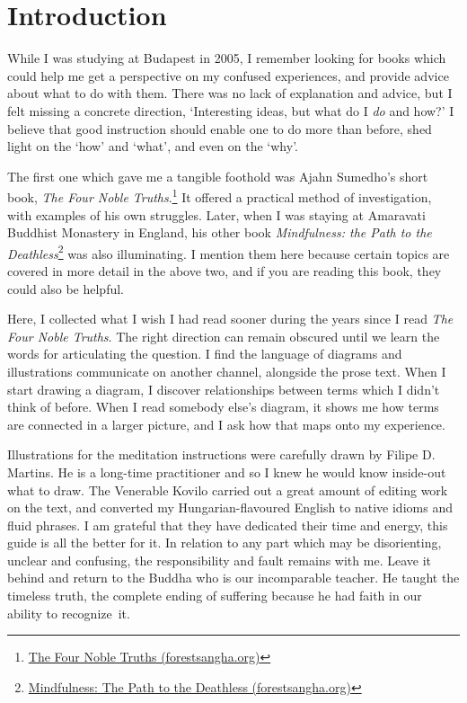\chapter{Introduction}

While I was studying at Budapest in 2005, I remember looking for books
which could help me get a perspective on my confused experiences, and
provide advice about what to do with them. There was no lack of
explanation and advice, but I felt missing a concrete direction,
`Interesting ideas, but what do I \emph{do} and how?' I believe that
good instruction should enable one to do more than before, shed light on
the `how' and `what', and even on the `why'.

The first one which gave me a tangible foothold was Ajahn Sumedho's
short book, \emph{The Four Noble Truths}.\footnote{\href{https://forestsangha.org/teachings/books/the-four-noble-truths?language=English}{The
  Four Noble Truths (forestsangha.org)}} It offered a practical method
of investigation, with examples of his own struggles. Later, when I was
staying at Amaravati Buddhist Monastery in England, his other book
\emph{Mindfulness: the Path to the Deathless}\footnote{\href{https://forestsangha.org/teachings/books/mindfulness-the-path-to-the-deathless?language=English}{Mindfulness:
  The Path to the Deathless (forestsangha.org)}} was also illuminating.
I mention them here because certain topics are covered in more detail in
the above two, and if you are reading this book, they could also be
helpful.

Here, I collected what I wish I had read sooner during the years since I
read \emph{The Four Noble Truths}. The right direction can remain
obscured until we learn the words for articulating the question. I find
the language of diagrams and illustrations communicate on another
channel, alongside the prose text. When I start drawing a diagram, I
discover relationships between terms which I didn't think of before.
When I read somebody else's diagram, it shows me how terms are connected
in a larger picture, and I ask how that maps onto my experience.

Illustrations for the meditation instructions were carefully drawn by
Filipe D. Martins. He is a long-time practitioner and so I knew he would
know inside-out what to draw. The Venerable Kovilo carried out a great
amount of editing work on the text, and converted my Hungarian-flavoured
English to native idioms and fluid phrases. I am grateful that they have
dedicated their time and energy, this guide is all the better for it. In
relation to any part which may be disorienting, unclear and confusing,
the responsibility and fault remains with me. Leave it behind and return
to the Buddha who is our incomparable teacher. He taught the timeless
truth, the complete ending of suffering because he had faith in our
ability to recognize~it.

